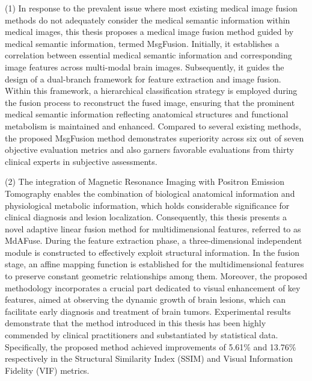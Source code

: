 \begin{englishabstract}
(1) In response to the prevalent issue where most existing medical image fusion methods do not adequately consider the medical semantic information within medical images, this thesis proposes a medical image fusion method guided by medical semantic information, termed MsgFusion. Initially, it establishes a correlation between essential medical semantic information and corresponding image features across multi-modal brain images. Subsequently, it guides the design of a dual-branch framework for feature extraction and image fusion.
Within this framework, a hierarchical classification strategy is employed during the fusion process to reconstruct the fused image, ensuring that the prominent medical semantic information reflecting anatomical structures and functional metabolism is maintained and enhanced. Compared to several existing methods, the proposed MsgFusion method demonstrates superiority across six out of seven objective evaluation metrics and also garners favorable evaluations from thirty clinical experts in subjective assessments.

(2) The integration of Magnetic Resonance Imaging with Positron Emission Tomography enables the combination of biological anatomical information and physiological metabolic information, which holds considerable significance for clinical diagnosis and lesion localization. Consequently, this thesis presents a novel adaptive linear fusion method for multidimensional features, referred to as MdAFuse.
During the feature extraction phase, a three-dimensional independent module is constructed to effectively exploit structural information. In the fusion stage, an affine mapping function is established for the multidimensional features to preserve constant geometric relationships among them. Moreover, the proposed methodology incorporates a crucial part dedicated to visual enhancement of key features, aimed at observing the dynamic growth of brain lesions, which can facilitate early diagnosis and treatment of brain tumors.
Experimental results demonstrate that the method introduced in this thesis has been highly commended by clinical practitioners and substantiated by statistical data. Specifically, the proposed method achieved improvements of 5.61\% and 13.76\% respectively in the Structural Similarity Index (SSIM) and Visual Information Fidelity (VIF) metrics.


\end{englishabstract}
